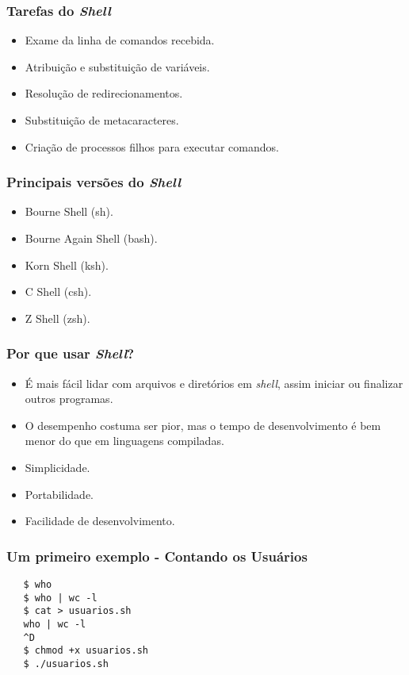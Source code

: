 \documentclass{beamer}
\begin{document}
   \begin{frame}
      \frametitle{Tarefas do \textit{Shell}}
      \begin{itemize}
         \item Exame da linha de comandos recebida.
         \item Atribuição e substituição de variáveis.
         \item Resolução de redirecionamentos.
         \item Substituição de metacaracteres.
         \item Criação de processos filhos para executar comandos.
      \end{itemize}
   \end{frame}

   \begin{frame}
      \frametitle{Principais versões do \textit{Shell}}
      \begin{itemize}
         \item Bourne Shell (sh).
         \item Bourne Again Shell (bash).
         \item Korn Shell (ksh).
         \item C Shell (csh).
         \item Z Shell (zsh).
      \end{itemize}
   \end{frame}

\begin{frame}
   \frametitle{Por que usar \textit{Shell}?}
   \begin{itemize}
      \item É mais fácil lidar com arquivos e diretórios em \textit{shell}, assim iniciar ou finalizar outros programas.
      \item O desempenho costuma ser pior, mas o tempo de desenvolvimento é bem menor do que em linguagens compiladas.
      \item Simplicidade.
      \item Portabilidade.
      \item Facilidade de desenvolvimento.
   \end{itemize}
\end{frame}


\begin{frame}[fragile]
   \frametitle{Um primeiro exemplo - Contando os Usuários}
   \begin{verbatim}
   $ who
   $ who | wc -l
   $ cat > usuarios.sh
   who | wc -l
   ^D
   $ chmod +x usuarios.sh
   $ ./usuarios.sh
   \end{verbatim}
\end{frame}
\end{document}

